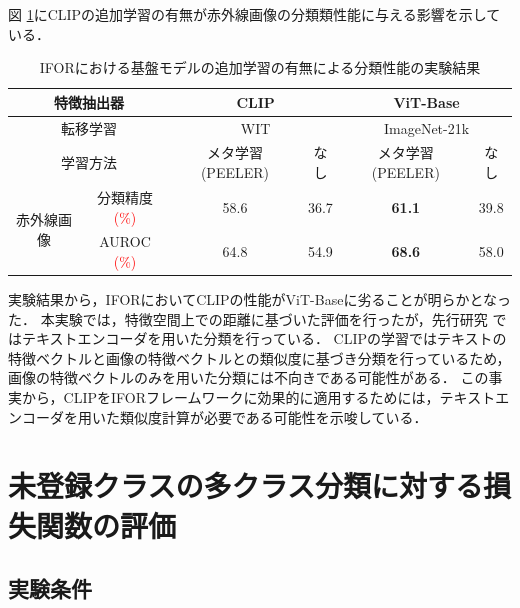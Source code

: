 \documentclass[a4paper,11pt,nomag]{jsreport}
\begin{document}
図 \ref{tbl:exp3}にCLIPの追加学習の有無が赤外線画像の分類類性能に与える影響を示している．
\begin{table}[tbp]
  \centering
  \caption{IFORにおける基盤モデルの追加学習の有無による分類性能の実験結果}
  \label{tbl:exp3}

  \begin{tabular}{cc||c|c|c|c}
      \hline
      \multicolumn{2}{c||}{特徴抽出器}      & \multicolumn{2}{c|}{CLIP} & \multicolumn{2}{c}{ViT-Base} \\ \hline
      \multicolumn{2}{c||}{転移学習}       &  \multicolumn{2}{c|}{WIT}  & \multicolumn{2}{c}{ImageNet-21k} \\ \hline
      \multicolumn{2}{c||}{学習方法}       & メタ学習 (PEELER) &   なし   & メタ学習 (PEELER) &    なし    \\ \hline\hline
      \multirow{2}{*}{赤外線画像} & 分類精度 \textcolor{red}{(\%)} &       58.6      &   36.7   &  \textbf{61.1}  &    39.8    \\
                                & AUROC \textcolor{red}{(\%)}   &       64.8      &   54.9   &  \textbf{68.6}  &    58.0    \\ \hline
  \end{tabular}
\end{table}
% 
実験結果から，IFORにおいてCLIPの性能がViT-Baseに劣ることが明らかとなった．
本実験では，特徴空間上での距離に基づいた評価を行ったが，先行研究 \cite{clip}ではテキストエンコーダを用いた分類を行っている．
CLIPの学習ではテキストの特徴ベクトルと画像の特徴ベクトルとの類似度に基づき分類を行っているため，画像の特徴ベクトルのみを用いた分類には不向きである可能性がある．
この事実から，CLIPをIFORフレームワークに効果的に適用するためには，テキストエンコーダを用いた類似度計算が必要である可能性を示唆している．

\section{未登録クラスの多クラス分類に対する損失関数の評価}

\subsection{実験条件}
\end{document}
